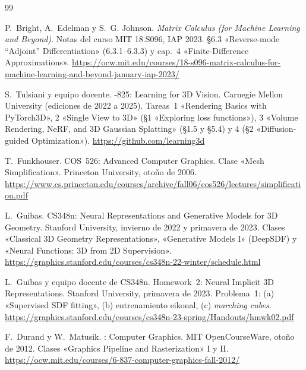 \begin{thebibliography}{99}
\small

P.~Bright, A.~Edelman y S.~G. Johnson.
\newblock \emph{Matrix Calculus (for Machine Learning and Beyond)}. Notas del curso MIT 18.S096, IAP 2023.
\newblock §6.3 «Reverse-mode “Adjoint” Differentiation» (6.3.1--6.3.3) y cap.~4 «Finite-Difference Approximations».
\newblock \url{https://ocw.mit.edu/courses/18-s096-matrix-calculus-for-machine-learning-and-beyond-january-iap-2023/}

S.~Tulsiani y equipo docente.
-825: Learning for 3D Vision.
\newblock Carnegie Mellon University (ediciones de 2022 a 2025). Tareas~1 «Rendering Basics with PyTorch3D», 2 «Single View to 3D» (§1 «Exploring loss functions»), 3 «Volume Rendering, NeRF, and 3D Gaussian Splatting» (§1.5 y §5.4) y 4 (§2 «Diffusion-guided Optimization»).
\newblock \url{https://github.com/learning3d}

T.~Funkhouser.
\newblock COS~526: Advanced Computer Graphics. Clase «Mesh Simplification».
\newblock Princeton University, otoño de 2006.
\newblock \url{https://www.cs.princeton.edu/courses/archive/fall06/cos526/lectures/simplification.pdf}

L.~Guibas.
\newblock CS348n: Neural Representations and Generative Models for 3D Geometry.
\newblock Stanford University, invierno de 2022 y primavera de 2023. Clases «Classical 3D Geometry Representations», «Generative Models I» (DeepSDF) y «Neural Functions: 3D from 2D Supervision».
\newblock \url{https://graphics.stanford.edu/courses/cs348n-22-winter/schedule.html}

L.~Guibas y equipo docente de CS348n.
\newblock Homework~2: Neural Implicit 3D Representations.
\newblock Stanford University, primavera de 2023. Problema~1: (a) «Supervised SDF fitting», (b) entrenamiento eikonal, (c) \emph{marching cubes}.
\newblock \url{https://graphics.stanford.edu/courses/cs348n-23-spring/Handouts/hmwk02.pdf}

F.~Durand y W.~Matusik.
: Computer Graphics.
\newblock MIT OpenCourseWare, otoño de 2012. Clases «Graphics Pipeline and Rasterization» I y II.
\newblock \url{https://ocw.mit.edu/courses/6-837-computer-graphics-fall-2012/}


\end{thebibliography}
